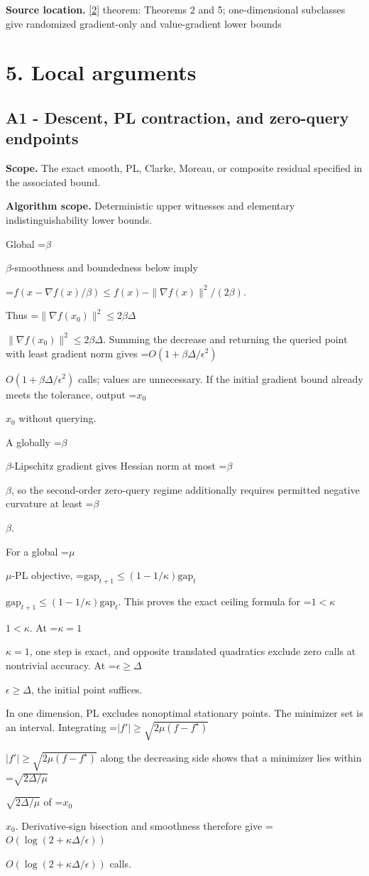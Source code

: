 \documentclass[10pt,a4paper]{article}
\newcommand{\AtlasMath}[1]{\par\begingroup\centering\setbox0=\hbox{$\displaystyle #1$}\ifdim\wd0>1.4\linewidth\typeout{ATLAS WIDE FORMULA: \the\wd0}\fi\ifdim\wd0>\linewidth\resizebox{\linewidth}{!}{\box0}\else\box0\fi\par\endgroup}
\newcommand{\AtlasInlineMath}[1]{\begingroup\setbox0=\hbox{$#1$}\ifdim\wd0>.4\linewidth\endgroup\AtlasMath{#1}\else\endgroup$#1$\fi}
\begin{document}
\textbf{Source location.} \href{https://arxiv.org/pdf/2209.07513}{[2]} theorem: Theorems 2 and 5; one-dimensional subclasses give randomized gradient-only and value-gradient lower bounds

\section{5. Local arguments}
\subsection{A1 - Descent, PL contraction, and zero-query endpoints}
\textbf{Scope.} The exact smooth, PL, Clarke, Moreau, or composite residual specified in the associated bound.

\textbf{Algorithm scope.} Deterministic upper witnesses and elementary indistinguishability lower bounds.

Global \AtlasInlineMath{\beta}-smoothness and boundedness below imply

\AtlasMath{f(x-\nabla f(x)/\beta)\le f(x)-\|\nabla f(x)\|^2/(2\beta).}

Thus \AtlasInlineMath{\|\nabla f(x_0)\|^2\le2\beta\Delta}. Summing the decrease and returning the queried point with least gradient norm gives \AtlasInlineMath{O(1+\beta\Delta/\epsilon^2)} calls; values are unnecessary. If the initial gradient bound already meets the tolerance, output \AtlasInlineMath{x_0} without querying.

A globally \AtlasInlineMath{\beta}-Lipschitz gradient gives Hessian norm at most \AtlasInlineMath{\beta}, so the second-order zero-query regime additionally requires permitted negative curvature at least \AtlasInlineMath{\beta}.

For a global \AtlasInlineMath{\mu}-PL objective,
\AtlasInlineMath{\mathrm{gap}_{t+1}\le(1-1/\kappa)\mathrm{gap}_t}.
This proves the exact ceiling formula for \AtlasInlineMath{1<\kappa}. At \AtlasInlineMath{\kappa=1}, one step is exact, and opposite translated quadratics exclude zero calls at nontrivial accuracy. At \AtlasInlineMath{\epsilon\ge\Delta}, the initial point suffices.

In one dimension, PL excludes nonoptimal stationary points. The minimizer set is an interval. Integrating
\AtlasInlineMath{|f'|\ge\sqrt{2\mu(f-f^\star)}}
along the decreasing side shows that a minimizer lies within \AtlasInlineMath{\sqrt{2\Delta/\mu}} of \AtlasInlineMath{x_0}. Derivative-sign bisection and smoothness therefore give \AtlasInlineMath{O(\log(2+\kappa\Delta/\epsilon))} calls.
\end{document}
